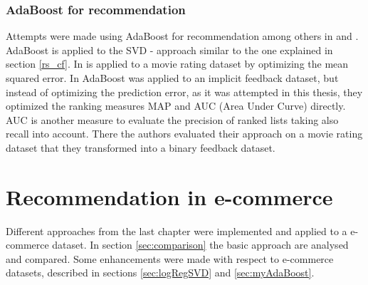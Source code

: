 \documentclass[10pt]{reportMaster}
\begin{document}
\subsection{AdaBoost for recommendation}
Attempts were made using AdaBoost for recommendation among others in \cite{boostingCFRatings} and \cite{boostingAUC}.
AdaBoost is applied to the SVD - approach similar to the one explained in section \ref{rs_cf}.
In \cite{boostingCFRatings} is applied to a movie rating dataset by optimizing the mean squared error. %
In \cite{boostingAUC} AdaBoost was applied to an implicit feedback dataset, but instead of optimizing the prediction error, as it was attempted in this thesis, they optimized the ranking measures MAP and AUC (Area Under Curve) directly.
AUC is another measure to evaluate the precision of ranked lists taking also recall into account. %
There the authors evaluated their approach on a movie rating dataset that they transformed into a binary feedback dataset.











\chapter{Recommendation in e-commerce}
\label{sec:ecommerceRec}
Different approaches from the last chapter were implemented and applied to a e-commerce dataset.
In section \ref{sec:comparison} the basic approach are analysed and compared.
Some enhancements were made with respect to e-commerce datasets, described in sections \ref{sec:logRegSVD} and \ref{sec:myAdaBoost}.
\end{document}
